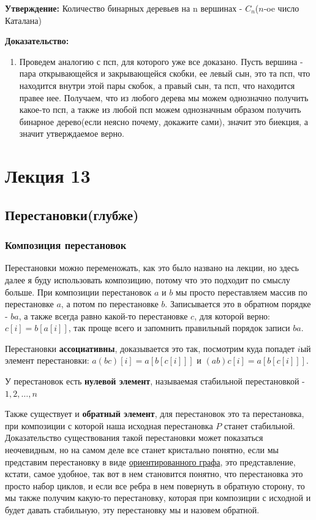\documentclass{article}
\begin{document}
\textbf{Утверждение:} Количество бинарных деревьев на n вершинах -  $C_n$($n$-oe число Каталана)

\textbf{Доказательство:}
\begin{enumerate}
    \item Проведем аналогию с псп, для которого уже все доказано. Пусть вершина - пара открывающейся и закрывающейся скобки, ее левый сын, это та псп, что находится внутри этой пары скобок, а правый сын, та псп, что находится правее нее. Получаем, что из любого дерева мы можем однозначно получить какое-то псп, а также из любой псп можем однозначным образом получить бинарное дерево(если неясно почему, докажите сами), значит это биекция, а значит утверждаемое верно. 
\end{enumerate}

\section{Лекция 13}
\subsection{Перестановки(глубже)}
\subsubsection{Композиция перестановок}
Перестановки можно переменожать, как это было названо на лекции, но здесь далее я буду использовать композицию, потому что это подходит по смыслу больше. При композиции перестановок $a$ и $b$ мы просто переставляем массив по перестановке $a$, а потом по перестановке $b$. Записывается это в обратном порядке - $ba$, а также всегда равно какой-то перестановке $c$, для которой верно: $c[i] = b[a[i]]$, так проще всего и запомнить правильный порядок записи $ba$.

Перестановки \textbf{ассоциативны}, доказывается это так, посмотрим куда попадет $i$ый элемент перестановки: $a(bc)[i]=a[b[c[i]]]$ и $(ab)c[i] = a[b[c[i]]]$.

У перестановок есть \textbf{нулевой элемент}, называемая стабильной перестановкой -  $1, 2, \dots, n$

Также существует и \textbf{обратный элемент}, для перестановок это та перестановка, при композиции с которой наша исходная перестановка $P$ станет стабильной. Доказательство существования такой перестановки может показаться неочевидным, но на самом деле все станет кристально понятно, если мы представим перестановку в виде \href{https://ru.wikipedia.org/wiki/%D0%9E%D1%80%D0%B8%D0%B5%D0%BD%D1%82%D0%B8%D1%80%D0%BE%D0%B2%D0%B0%D0%BD%D0%BD%D1%8B%D0%B9_%D0%B3%D1%80%D0%B0%D1%84}{ориентированного графа}, это представление, кстати, самое удобное, так вот в нем становится понятно, что перестановка это просто набор циклов, и если все ребра в нем повернуть в обратную сторону, то мы также получим какую-то перестановку, которая при композиции с исходной и будет давать стабильную, эту перестановку мы и назовем обратной.
\end{document}
